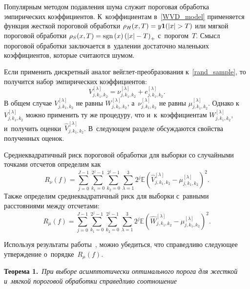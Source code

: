 \begin{multicols}{2}
Популярным методом подавления шума служит пороговая обработка 
эмпирических коэффициентов. К~коэффициентам в~\eqref{WVD_model} 
применяется функция жесткой пороговой обработки 
$\rho_{H}(x,T)\hm=y\mathbf{1}(\absv{x}\hm>T)$ или мягкой пороговой 
обработки $\rho_{S}(x,T)\hm=\mathrm{sgn}\,(x)\left(\absv{x}\hm-
T\right)_{+}$ с~порогом~$T$. Смысл пороговой обработки заключается 
в~удалении достаточно маленьких коэффициентов, которые считаются шумом.

Если применить дискретный аналог вейг\-лет-пре\-об\-ра\-зо\-ва\-ния 
к~\eqref{rand_sample}, то получится набор эмпирических коэффициентов:
\begin{equation*}
V_{j,k_1,k_2}^{[\lambda]} = \nu_{j,k_1,k_2}^{[\lambda]} + 
e_{j,k_1,k_2}^{[\lambda]}.
\end{equation*}
В общем случае $V_{j,k_1,k_2}^{[\lambda]}$ не равны 
$W_{j,k_1,k_2}^{[\lambda]}$, а~$\nu_{j,k_1,k_2}^{[\lambda]}$ не равны 
$\mu_{j,k_1,k_2}^{[\lambda]}$. Однако к~$V_{j,k_1,k_2}^{[\lambda]}$ можно 
применить ту же процедуру, что и~к~коэффициентам 
$W_{j,k_1,k_2}^{[\lambda]}$, и~получить 
оценки~$\widehat{V}_{j,k_1,k_2}^{[\lambda]}$. В~следующем разделе 
обсуждаются свойства полученных оценок.

Среднеквадратичный риск пороговой обработки для выборки со случайными 
точками отсчетов определим как
\begin{equation*}
R_{\nu}(f) = \sum\limits_{j = 0}^{J - 1}\sum_{k_1=0}^{2^j-1}
\sum\limits_{k_2=0}^{2^j-1}\sum\limits_{\lambda=1}^3 
2^j\mathbb{E}\left(\widehat{V}_{j,k_1,k_2}^{[\lambda]}-
\mu_{j,k_1,k_2}^{[\lambda]} \right)^2. 
\end{equation*}
Также определим среднеквадратичный риск для выборки с~равными 
расстояниями между отсчетами:
\begin{equation*} %
R_{\mu}(f) = \sum\limits_{j = 0}^{J - 1}\sum\limits_{k_1=0}^{2^j-
1}\sum_{k_2=0}^{2^j-1}\sum\limits_{\lambda=1}^3 
2^j\mathbb{E}\left(\widehat{W}_{j,k_1,k_2}^{[\lambda]}-
\mu_{j,k_1,k_2}^{[\lambda]} \right)^2.
\end{equation*}

Используя результаты работы~\cite{D94}, можно убедиться, что справедливо 
следующее утверждение о~порядке~$R_{\mu}(f)$.

\smallskip

\noindent
\textbf{Теорема 1.}\ \textit{При выборе асимптотически оптимального 
порога для жесткой и~мягкой пороговой обработки справедливо соотношение}


\end{multicols}
